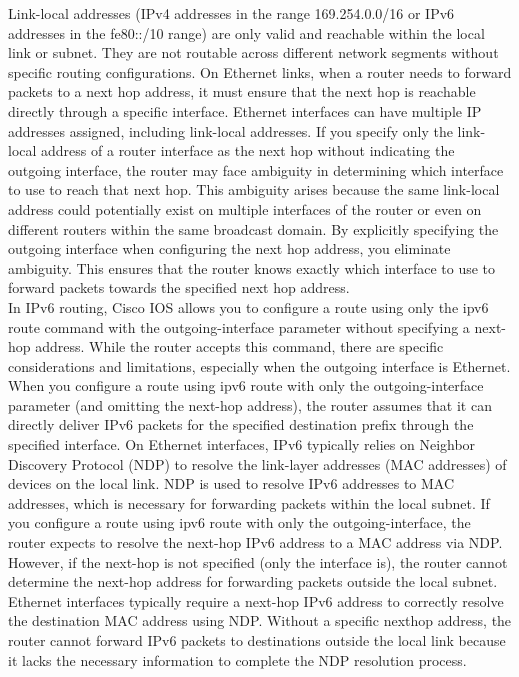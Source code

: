 \documentclass{article}
\begin{document}
	Link-local addresses (IPv4 addresses in the range 169.254.0.0/16 or IPv6 addresses in the fe80::/10 range) are only valid and reachable within the local link or subnet. They are not routable across different network segments without specific routing configurations. On Ethernet links, when a router needs to forward packets to a next hop address, it must ensure that the next hop is reachable directly through a specific interface. Ethernet interfaces can have multiple IP addresses assigned, including link-local addresses. If you specify only the link-local address of a router interface as the next hop without indicating the outgoing interface, the router may face ambiguity in determining which interface to use to reach that next hop. This ambiguity arises because the same link-local address could potentially exist on multiple interfaces of the router or even on different routers within the same broadcast domain. By explicitly specifying the outgoing interface when configuring the next hop address, you eliminate ambiguity. This ensures that the router knows exactly which interface to use to forward packets towards the specified next hop address.\\
	
	In IPv6 routing, Cisco IOS allows you to configure a route using only the ipv6 route command with the outgoing-interface parameter without specifying a next-hop address. While the router accepts this command, there are specific considerations and limitations, especially when the outgoing interface is Ethernet. When you configure a route using ipv6 route with only the outgoing-interface parameter (and omitting the next-hop address), the router assumes that it can directly deliver IPv6 packets for the specified destination prefix through the specified interface. On Ethernet interfaces, IPv6 typically relies on Neighbor Discovery Protocol (NDP) to resolve the link-layer addresses (MAC addresses) of devices on the local link. NDP is used to resolve IPv6 addresses to MAC addresses, which is necessary for forwarding packets within the local subnet. If you configure a route using ipv6 route with only the outgoing-interface, the router expects to resolve the next-hop IPv6 address to a MAC address via NDP. However, if the next-hop is not specified (only the interface is), the router cannot determine the next-hop address for forwarding packets outside the local subnet. Ethernet interfaces typically require a next-hop IPv6 address to correctly resolve the destination MAC address using NDP. Without a specific next\-hop address, the router cannot forward IPv6 packets to destinations outside the local link because it lacks the necessary information to complete the NDP resolution process.\\
	
\end{document}

